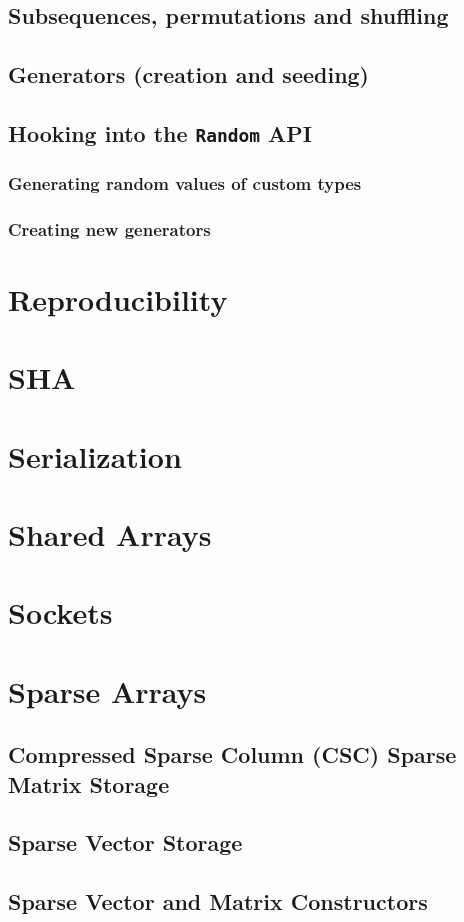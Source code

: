     \section{Subsequences, permutations and shuffling}
    \section{Generators (creation and seeding)}
    \section{Hooking into the \texttt{Random} API}
    \subsection{Generating random values of custom types}
    \subsection{Creating new generators}
\chapter{Reproducibility}
\chapter{SHA}
\chapter{Serialization}
\chapter{Shared Arrays}
\chapter{Sockets}
\chapter{Sparse Arrays}
    \section{Compressed Sparse Column (CSC) Sparse Matrix Storage}
    \section{Sparse Vector Storage}
    \section{Sparse Vector and Matrix Constructors}
